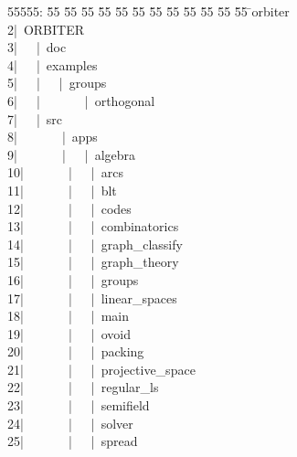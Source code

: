 %
%
\begin{tabbing}
55555: \= 55 \= 55 \= 55 \= 55 \= 55 \= 55 \= 55 \= 55 \= 55 \= 55 \= 55 \= 55 \= \>orbiter\\[0pt]
2\>|\ ORBITER\\[0pt]
3\>|  \ |\ doc\\[0pt]
4\>|  \ |\ examples\\[0pt]
5\>|  \ |  \ |\ groups\\[0pt]
6\>|  \ |  \ \ \ \ \ |\ orthogonal\\[0pt]
7\>|  \ |\ src\\[0pt]
8\>|  \ \ \ \ \ |\ apps\\[0pt]
9\>|  \ \ \ \ \ |  \ |\ algebra\\[0pt]
10\>|  \ \ \ \ \ |  \ |\ arcs\\[0pt]
11\>|  \ \ \ \ \ |  \ |\ blt\\[0pt]
12\>|  \ \ \ \ \ |  \ |\ codes\\[0pt]
13\>|  \ \ \ \ \ |  \ |\ combinatorics\\[0pt]
14\>|  \ \ \ \ \ |  \ |\ graph\_classify\\[0pt]
15\>|  \ \ \ \ \ |  \ |\ graph\_theory\\[0pt]
16\>|  \ \ \ \ \ |  \ |\ groups\\[0pt]
17\>|  \ \ \ \ \ |  \ |\ linear\_spaces\\[0pt]
18\>|  \ \ \ \ \ |  \ |\ main\\[0pt]
19\>|  \ \ \ \ \ |  \ |\ ovoid\\[0pt]
20\>|  \ \ \ \ \ |  \ |\ packing\\[0pt]
21\>|  \ \ \ \ \ |  \ |\ projective\_space\\[0pt]
22\>|  \ \ \ \ \ |  \ |\ regular\_ls\\[0pt]
23\>|  \ \ \ \ \ |  \ |\ semifield\\[0pt]
24\>|  \ \ \ \ \ |  \ |\ solver\\[0pt]
25\>|  \ \ \ \ \ |  \ |\ spread\\[0pt]

\end{tabbing}
